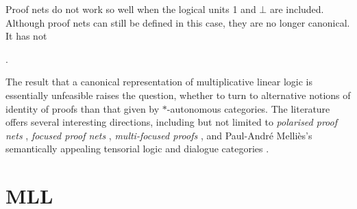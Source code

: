 \documentclass{lmcs}
\let\capsabbrev=\uppercase
\begin{document}
Proof nets do not work so well when the logical units 1 and $\bot$ are included. Although
proof nets can still be defined in this case, they are no longer canonical. It has not

\cite{Lambek-1968}

\cite{Girard-1987,Danos-Regnier-1989}
\cite{Trimble-1994,Blute-Cockett-Seely-Trimble-1996}
\cite{Koh-Ong-1999}
\cite{Lamarche-Strassburger-2006}
\cite{Hughes-2012-categories,Hughes-2012-nets}


\cite{Hughes-vanGlabbeek-2005}
\cite{Heijltjes-2011}

\cite{Demaine-Hearn-2008}

\cite{ReconfigurationProblems}
\cite{Kanovich-1992,Lincoln-Winkler-1994}.



The result that a canonical representation of multiplicative linear logic is essentially unfeasible raises the question, whether to turn to alternative notions of identity of proofs than that given by $*$-autonomous categories. The literature offers several interesting directions, including but not limited to \emph{polarised proof nets} \cite{Laurent-1999}, \emph{focused proof nets} \cite{Andreoli-Maieli-1999}, \emph{multi-focused proofs} \cite{Chaudhuri-Miller-Saurin-2008}, and Paul-Andr\'e Melli\`es's semantically appealing tensorial logic and dialogue categories \cite{Mellies-2012}.



\section{\protect\capsabbrev{mll}}
\end{document}
